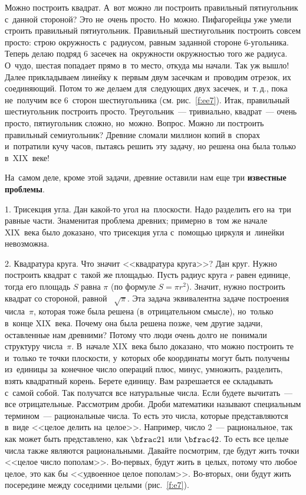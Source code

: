 Можно построить квадрат. А~вот можно ли построить правильный пятиугольник с~данной стороной? Это
не~очень просто. Но~можно. Пифагорейцы уже умели строить правильный пятиугольник. Правильный
шестиугольник построить совсем просто: строю окружность с~радиусом, равным заданной стороне 6-угольника.
 Теперь делаю подряд 6 засечек
на~окружности окружностью того же радиуса. О~чудо, шестая попадает прямо в~то место, откуда мы
начали. Так уж вышло! Далее прикладываем линейку к~первым двум засечкам и~проводим отрезок, их
соединяющий. Потом то же делаем для~следующих двух засечек, и~т.\,д., пока не~получим все 6~сторон
шестиугольника (см. рис.~\ref{f:ee7}). Итак, правильный шестиугольник построить просто. Треугольник~--- тривиально, квадрат~--- очень
просто, пятиугольник сложно, но~можно. Вопрос. Можно ли построить правильный семиугольник? Древние сломали
миллион копий в~спорах и~потратили кучу часов, пытаясь решить эту задачу, но решена она была только в~XIX~веке!


На~самом деле, кроме этой задачи, древние оставили нам еще три \textbf{известные проблемы}.

1. Трисекция угла. Дан какой-то угол на~плоскости. Надо разделить его на~три равные части. Знаменитая
проблема древних; примерно в~том же начале XIX~века было доказано, что трисекция угла
с~помощью циркуля и~линейки невозможна.

2. Квадратура круга. Что значит <<квадратура круга>>? Дан круг. Нужно построить квадрат с~такой же
площадью. Пусть радиус круга $r$ равен единице, тогда его площадь $S$ равна $\pi$ (по формуле $S = \pi r^{2}$).
Значит, нужно построить квадрат со стороной, равной ~$\sqrt{\pi}$. Эта задача эквивалентна задаче
построения числа~$\pi$,  которая тоже была решена (в~отрицательном смысле), но~только в~конце XIX~века.
 Почему она была решена позже, чем другие задачи, оставленные нам древними?
Потому что люди очень долго не~понимали структуру числа~$\pi$. В~начале XIX~века было
доказано, что можно построить те и~только те точки плоскости, у~которых обе координаты могут быть
получены из~единицы за~конечное число операций плюс, минус, умножить, разделить, взять квадратный
корень. Берете единицу. Вам разрешается ее складывать с~самой собой. Так получатся
все натуральные числа. Если будете вычитать~--- все отрицательные. Рассмотрим дроби. Дроби
математики называют специальным термином~--- рациональные числа. То есть это числа, которые
представляются в~виде <<целое делить на~целое>>. Например, число 2~--- рациональное, так как может быть
представлено, как $\bfrac 21$ или $\bfrac 42$. То есть все целые числа также являются рациональными. Давайте
посмотрим, где будут жить точки <<целое число пополам>>. Во-первых, будут жить в~целых, потому что
любое целое, это как бы <<удвоенное целое пополам>>. Во-вторых, они будут жить посередине между
соседними целыми (рис.~\ref{f:e7}).

